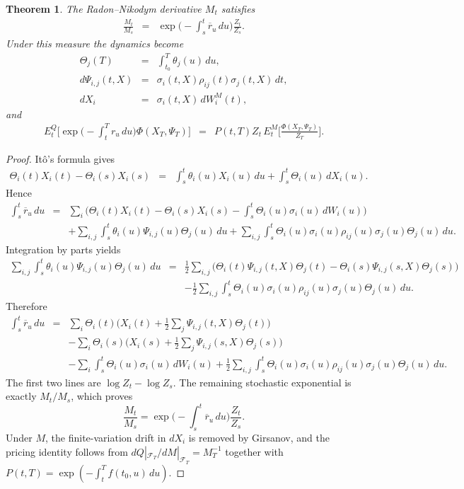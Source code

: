 \documentclass[12pt,a4paper,final]{article}
\theoremstyle{plain}
\newtheorem{theorem}{Theorem}[section]
\begin{document}
\begin{theorem}\label{thm:rn}
The Radon--Nikodym derivative $M_t$ satisfies
\begin{eqnarray*}
\frac{M_t}{M_s}
&=&\exp\Biggl(-\int_{s}^{t}\overline{r}_u\,du\Biggr)\frac{Z_t}{Z_s}.
\end{eqnarray*}
Under this measure the dynamics become
\begin{eqnarray*}
\Theta_j(T)&=&\int_{t_0}^{T}\theta_j(u)\,du,\\
d\Psi_{i,j}(t,X)&=&\sigma_i(t,X)\rho_{ij}(t)\sigma_j(t,X)\,dt,\\
dX_i&=&\sigma_i(t,X)\,dW^{M}_i(t),
\end{eqnarray*}
and
\begin{eqnarray*}
E_{t}^{Q}\Biggl[\exp\Biggl(-\int_{t}^{T} r_u\,du\Biggr)\Phi(X_T,\Psi_T)\Biggr]
&=&P(t,T)Z_t\,E_{t}^{M}\Biggl[\frac{\Phi(X_T,\Psi_T)}{Z_T}\Biggr].
\end{eqnarray*}
\end{theorem}

\begin{proof}
It\^{o}'s formula gives
\begin{eqnarray*}
\Theta_i(t)X_i(t)-\Theta_i(s)X_i(s)
&=&\int_{s}^{t}\theta_i(u)X_i(u)\,du
+\int_{s}^{t}\Theta_i(u)\,dX_i(u).
\end{eqnarray*}
Hence
\begin{eqnarray*}
\int_{s}^{t}\overline{r}_u\,du
&=&\sum_{i}\Biggl(
\Theta_i(t)X_i(t)-\Theta_i(s)X_i(s)
-\int_{s}^{t}\Theta_i(u)\sigma_i(u)\,dW_i(u)\Biggr)\\
&&+\sum_{i,j}\int_{s}^{t}\theta_i(u)\Psi_{i,j}(u)\Theta_j(u)\,du
+\sum_{i,j}\int_{s}^{t}\Theta_i(u)\sigma_i(u)\rho_{ij}(u)\sigma_j(u)\Theta_j(u)\,du.
\end{eqnarray*}
Integration by parts yields
\begin{eqnarray*}
\sum_{i,j}\int_{s}^{t}\theta_i(u)\Psi_{i,j}(u)\Theta_j(u)\,du
&=&\frac12\sum_{i,j}\Biggl(
\Theta_i(t)\Psi_{i,j}(t,X)\Theta_j(t)
-\Theta_i(s)\Psi_{i,j}(s,X)\Theta_j(s)\Biggr)\\
&&-\frac12\sum_{i,j}\int_{s}^{t}
\Theta_i(u)\sigma_i(u)\rho_{ij}(u)\sigma_j(u)\Theta_j(u)\,du.
\end{eqnarray*}
Therefore
\begin{eqnarray*}
\int_{s}^{t}\overline{r}_u\,du
&=&\sum_{i}\Theta_i(t)
\Biggl(X_i(t)+\frac12\sum_{j}\Psi_{i,j}(t,X)\Theta_j(t)\Biggr)\\
&&-\sum_{i}\Theta_i(s)
\Biggl(X_i(s)+\frac12\sum_{j}\Psi_{i,j}(s,X)\Theta_j(s)\Biggr)\\
&&-\sum_{i}\int_{s}^{t}\Theta_i(u)\sigma_i(u)\,dW_i(u)
+\frac12\sum_{i,j}\int_{s}^{t}
\Theta_i(u)\sigma_i(u)\rho_{ij}(u)\sigma_j(u)\Theta_j(u)\,du.
\end{eqnarray*}
The first two lines are $\log Z_t-\log Z_s$. The remaining stochastic
exponential is exactly $M_t/M_s$, which proves
\[
\frac{M_t}{M_s}
=\exp\Biggl(-\int_{s}^{t}\overline{r}_u\,du\Biggr)\frac{Z_t}{Z_s}.
\]
Under $M$, the finite-variation drift in $dX_i$ is removed by Girsanov,
and the pricing identity follows from $dQ|_{{\mathcal F}_T}/dM|_{{\mathcal F}_T}=M_T^{-1}$
together with $P(t,T)=\exp(-\int_t^T f(t_0,u)\,du)$.
\end{proof}
\end{document}
